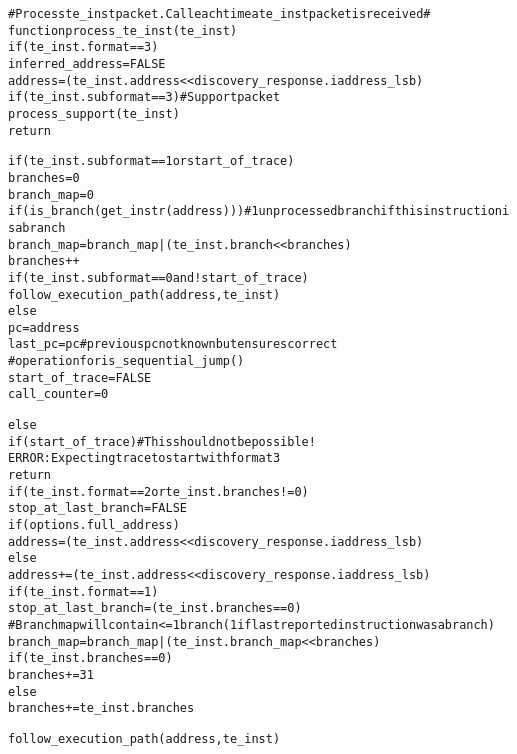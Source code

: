 \begin{alltt}
# Process te_inst packet.  Call each time a te_inst packet is received #
function process_te_inst (te_inst)
  if (te_inst.format == 3)
    inferred_address = FALSE
    address       = (te_inst.address << discovery_response.iaddress_lsb)
    if (te_inst.subformat == 3) # Support packet
      process_support(te_inst)
      return

    if (te_inst.subformat == 1 or start_of_trace)
      branches    = 0
      branch_map  = 0
    if (is_branch(get_instr(address))) # 1 unprocessed branch if this instruction is a branch
      branch_map = branch_map | (te_inst.branch << branches)
      branches++
    if (te_inst.subformat == 0 and !start_of_trace)
      follow_execution_path(address, te_inst)
    else
      pc           = address
      last_pc      = pc # previous pc not known but ensures correct
                        #  operation for is_sequential_jump()
    start_of_trace = FALSE
    call_counter   = 0

  else
    if (start_of_trace) # This should not be possible!
      ERROR: Expecting trace to start with format 3
      return
    if (te_inst.format == 2 or te_inst.branches != 0)
      stop_at_last_branch = FALSE
      if (options.full_address)
        address  = (te_inst.address << discovery_response.iaddress_lsb)
      else
        address += (te_inst.address << discovery_response.iaddress_lsb)
    if (te_inst.format == 1)
      stop_at_last_branch = (te_inst.branches == 0)
      # Branch map will contain <= 1 branch (1 if last reported instruction was a branch)
      branch_map = branch_map | (te_inst.branch_map << branches)
      if (te_inst.branches == 0)
        branches += 31
      else
        branches += te_inst.branches

    follow_execution_path(address, te_inst)
\end{alltt}

\pagebreak

